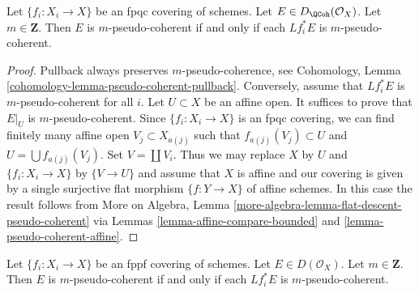 \begin{lemma}
\label{lemma-pseudo-coherent-descends-fpqc}
Let $\{f_i : X_i \to X\}$ be an fpqc covering of schemes. Let
$E \in D_\QCoh(\mathcal{O}_X)$. Let $m \in \mathbf{Z}$.
Then $E$ is $m$-pseudo-coherent if and only if each
$Lf_i^*E$ is $m$-pseudo-coherent.
\end{lemma}

\begin{proof}
Pullback always preserves $m$-pseudo-coherence, see
Cohomology, Lemma \ref{cohomology-lemma-pseudo-coherent-pullback}.
Conversely, assume that $Lf_i^*E$ is $m$-pseudo-coherent for all $i$.
Let $U \subset X$ be an affine open. It suffices to prove that
$E|_U$ is $m$-pseudo-coherent. Since $\{f_i : X_i \to X\}$ is an
fpqc covering, we can find finitely many affine open $V_j \subset X_{a(j)}$
such that $f_{a(j)}(V_j) \subset U$ and $U = \bigcup f_{a(j)}(V_j)$.
Set $V = \coprod V_i$.
Thus we may replace $X$ by $U$ and $\{f_i : X_i \to X\}$ by
$\{V \to U\}$ and assume that $X$ is affine and our covering
is given by a single surjective flat morphism $\{f : Y \to X\}$
of affine schemes. In this case the result follows from
More on Algebra, Lemma \ref{more-algebra-lemma-flat-descent-pseudo-coherent}
via Lemmas \ref{lemma-affine-compare-bounded} and
\ref{lemma-pseudo-coherent-affine}.
\end{proof}

\begin{lemma}
\label{lemma-pseudo-coherent-descends-fppf}
Let $\{f_i : X_i \to X\}$ be an fppf covering of schemes. Let
$E \in D(\mathcal{O}_X)$. Let $m \in \mathbf{Z}$.
Then $E$ is $m$-pseudo-coherent if and only if each
$Lf_i^*E$ is $m$-pseudo-coherent.
\end{lemma}

